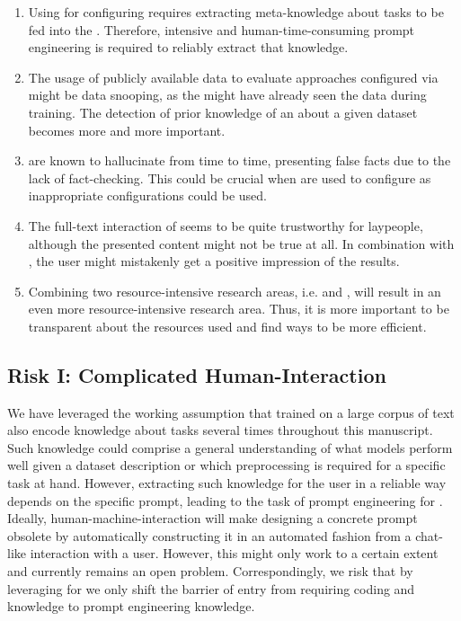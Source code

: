 \begin{enumerate}
    \item Using \LLMs for configuring \AutoML requires extracting meta-knowledge about \AutoML tasks to be fed into the \LLMs. Therefore, intensive and human-time-consuming prompt engineering is required to reliably extract that knowledge.
    \item The usage of publicly available data to evaluate \AutoML approaches configured via \LLMs might be data snooping, as the \LLM might have already seen the data during training. The detection of prior knowledge of an \LLM about a given dataset becomes more and more important.
    \item \LLMs are known to hallucinate from time to time, presenting false facts due to the lack of fact-checking. This could be crucial when \LLMs are used to configure \AutoML as inappropriate configurations could be used.
    \item The full-text interaction of \LLMs seems to be quite trustworthy for laypeople, although the presented content might not be true at all. In combination with \AutoML, the user might mistakenly get a positive impression of the results.
    \item Combining two resource-intensive research areas, i.e. \LLMs and \AutoML, will result in an even more resource-intensive research area. Thus, it is more important to be transparent about the resources used and find ways to be more efficient.
\end{enumerate}

\subsection{Risk I: Complicated Human-Interaction} We have leveraged the working assumption that \LLMs trained on a large corpus of text also encode knowledge about \AutoML tasks several times throughout this manuscript. Such knowledge could comprise a general understanding of what models perform well given a dataset description or which preprocessing is required for a specific task at hand. However, extracting such knowledge for the user in a reliable way depends on the specific prompt, leading to the task of prompt engineering for \AutoML \cite{sorensen-etal-2022-information}. Ideally, human-machine-interaction will make designing a concrete prompt obsolete by automatically constructing it in an automated fashion from a chat-like interaction with a user. However, this might only work to a certain extent and currently remains an open problem. Correspondingly, we risk that by leveraging \LLMs for \AutoML we only shift the barrier of entry from requiring coding and \ML knowledge to prompt engineering knowledge.

